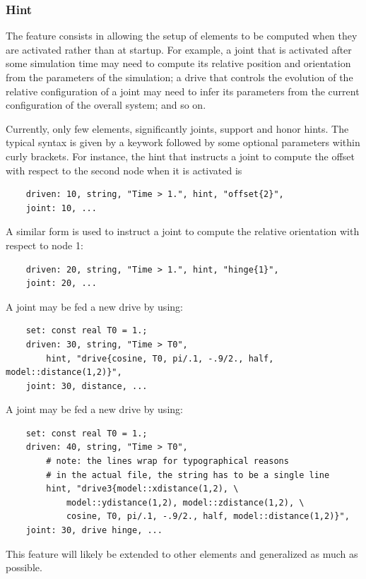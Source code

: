 \subsubsection{Hint}
The  feature consists in allowing the setup of elements
to be computed when they are activated rather than at startup.
For example, a joint that is activated after some simulation time
may need to compute its relative position and orientation
from the parameters of the simulation; a drive that controls
the evolution of the relative configuration of a joint may need
to infer its parameters from the current configuration
of the overall system; and so on.

Currently, only few elements, significantly joints, support 
and honor hints.
The typical syntax is given by a keywork followed by some optional
parameters within curly brackets.
For instance, the hint that instructs a joint to compute the offset
with respect to the second node when it is activated is
\begin{verbatim}
    driven: 10, string, "Time > 1.", hint, "offset{2}",
    joint: 10, ...
\end{verbatim}
A similar form is used to instruct a joint to compute the relative
orientation with respect to node 1:
\begin{verbatim}
    driven: 20, string, "Time > 1.", hint, "hinge{1}",
    joint: 20, ...
\end{verbatim}
A  joint may be fed a new drive by using:
\begin{verbatim}
    set: const real T0 = 1.;
    driven: 30, string, "Time > T0",
        hint, "drive{cosine, T0, pi/.1, -.9/2., half, model::distance(1,2)}",
    joint: 30, distance, ... 
\end{verbatim}
A  joint may be fed a new drive by using:
\begin{verbatim}
    set: const real T0 = 1.;
    driven: 40, string, "Time > T0",
        # note: the lines wrap for typographical reasons
        # in the actual file, the string has to be a single line
        hint, "drive3{model::xdistance(1,2), \
            model::ydistance(1,2), model::zdistance(1,2), \
            cosine, T0, pi/.1, -.9/2., half, model::distance(1,2)}",
    joint: 30, drive hinge, ... 
\end{verbatim}

This feature will likely be extended to other elements
and generalized as much as possible.


